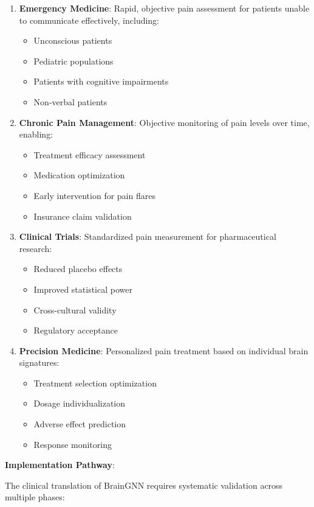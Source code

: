 \documentclass[10pt,journal,compsoc]{IEEEtran}
\begin{document}
\begin{enumerate}
\item \textbf{Emergency Medicine}: Rapid, objective pain assessment for patients unable to communicate effectively, including:
   \begin{itemize}
   \item Unconscious patients
   \item Pediatric populations
   \item Patients with cognitive impairments
   \item Non-verbal patients
   \end{itemize}

\item \textbf{Chronic Pain Management}: Objective monitoring of pain levels over time, enabling:
   \begin{itemize}
   \item Treatment efficacy assessment
   \item Medication optimization
   \item Early intervention for pain flares
   \item Insurance claim validation
   \end{itemize}

\item \textbf{Clinical Trials}: Standardized pain measurement for pharmaceutical research:
   \begin{itemize}
   \item Reduced placebo effects
   \item Improved statistical power
   \item Cross-cultural validity
   \item Regulatory acceptance
   \end{itemize}

\item \textbf{Precision Medicine}: Personalized pain treatment based on individual brain signatures:
   \begin{itemize}
   \item Treatment selection optimization
   \item Dosage individualization
   \item Adverse effect prediction
   \item Response monitoring
   \end{itemize}
\end{enumerate}

\textbf{Implementation Pathway}:

The clinical translation of BrainGNN requires systematic validation across multiple phases:
\end{document}

